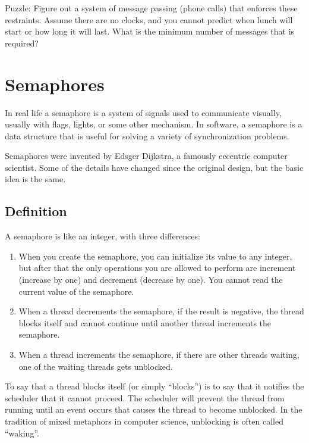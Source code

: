 \documentclass{book}
\newcommand{\clearemptydoublepage}{\newpage\cleardoublepage}
\begin{document}
Puzzle: Figure out a system of message passing (phone calls) that
enforces these restraints.  Assume there are no clocks, and you
cannot predict when lunch will start or how long it will last.  What
is the minimum number of messages that is required?


\clearemptydoublepage
\chapter{Semaphores}

In real life a semaphore is a system of signals used to communicate
visually, usually with flags, lights, or some other mechanism.  In
software, a semaphore is a data structure that is useful for solving a
variety of synchronization problems.

Semaphores were invented by Edsger Dijkstra, a famously eccentric
computer scientist.  Some of the details have changed since the
original design, but the basic idea is the same.

\section{Definition}

A semaphore is like an integer, with three differences:

\begin{enumerate}

\item When you create the semaphore, you can initialize its value to
any integer, but after that the only operations you are allowed to
perform are increment (increase by one) and decrement (decrease by
one).  You cannot read the current value of the semaphore.

\item When a thread decrements the semaphore, if the result is
negative, the thread blocks itself and cannot continue until another
thread increments the semaphore.

\item When a thread increments the semaphore, if there are other
threads waiting, one of the waiting threads gets unblocked.

\end{enumerate}

To say that a thread blocks itself (or simply ``blocks'') is to say
that it notifies the scheduler that it cannot proceed.  The scheduler
will prevent the thread from running until an event occurs that causes
the thread to become unblocked.  In the tradition of mixed metaphors
in computer science, unblocking is often called ``waking''.
\end{document}
